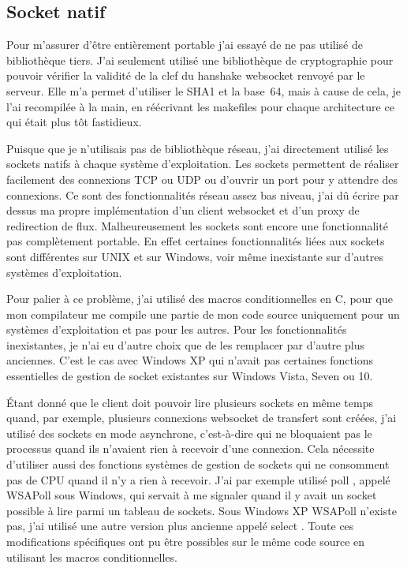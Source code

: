 \subsection{Socket natif}

Pour m'assurer d'être entièrement portable j'ai essayé de ne pas
utilisé de bibliothèque tiers. J'ai seulement utilisé une bibliothèque
de cryptographie pour pouvoir vérifier la validité de la clef du
hanshake websocket renvoyé par le serveur. Elle m'a permet d'utiliser
le SHA1 et la base~64, mais à cause de cela, je l'ai recompilée à la
main, en réécrivant les makefiles pour chaque architecture ce qui
était plus tôt fastidieux.

Puisque que je n'utilisais pas de bibliothèque réseau, j'ai
directement utilisé les sockets natifs à chaque système
d'exploitation. Les sockets permettent de réaliser facilement des
connexions TCP ou UDP ou d'ouvrir un port pour y attendre des
connexions. Ce sont des fonctionnalités réseau assez bas niveau, j'ai
dû écrire par dessus ma propre implémentation d'un client websocket et
d'un proxy de redirection de flux. Malheureusement les sockets sont
encore une fonctionnalité pas complètement portable. En effet
certaines fonctionnalités liées aux sockets sont différentes sur UNIX
et sur Windows, voir même inexistante sur d'autres systèmes
d'exploitation.

Pour palier à ce problème, j'ai utilisé des macros conditionnelles en
C, pour que mon compilateur me compile une partie de mon code source
uniquement pour un systèmes d'exploitation et pas pour les
autres. Pour les fonctionnalités inexistantes, je n'ai eu d'autre
choix que de les remplacer par d'autre plus anciennes.  C'est le cas
avec Windows XP qui n'avait pas certaines fonctions essentielles de
gestion de socket existantes sur Windows Vista, Seven ou 10.

Étant donné que le client doit pouvoir lire plusieurs sockets en même
temps quand, par exemple, plusieurs connexions websocket de transfert
sont créées, j'ai utilisé des sockets en mode asynchrone, c'est-à-dire
qui ne bloquaient pas le processus quand ils n'avaient rien à recevoir
d'une connexion. Cela nécessite d'utiliser aussi des fonctions
systèmes de gestion de sockets qui ne consomment pas de CPU quand il
n'y a rien à recevoir. J'ai par exemple utilisé \og poll \fg{}, appelé
\og WSAPoll \fg{} sous Windows, qui servait à me signaler quand il y
avait un socket possible à lire parmi un tableau de sockets. Sous
Windows XP \og WSAPoll \fg{} n'existe pas, j'ai utilisé une autre
version plus ancienne appelé \og select \fg{}. Toute ces modifications
spécifiques ont pu être possibles sur le même code source en utilisant
les macros conditionnelles.


